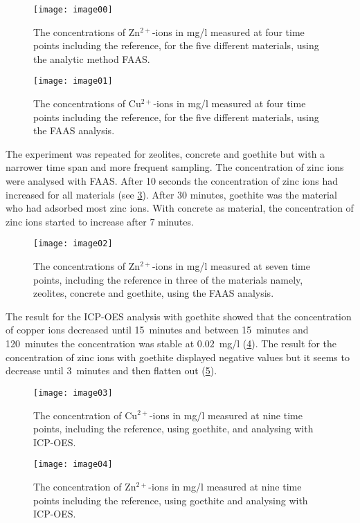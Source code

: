 \begin{figure}[H]
    \centering
    \texttt{[image: image00]}
    \caption{The concentrations of Zn$^{2+}$-ions in mg/l measured at four time points including the reference, for the five different materials, using the analytic method FAAS.}\label{fig:image00}
\end{figure}


\begin{figure}[H]
    \centering
    \texttt{[image: image01]}
    \caption{The concentrations of Cu$^{2+}$-ions in mg/l measured at four time points including the reference, for the five different materials, using the FAAS analysis.}\label{fig:image01}
\end{figure}

The experiment was repeated for zeolites, concrete and goethite but with a narrower time span and more frequent sampling. The concentration of zinc ions were analysed with FAAS. After 10 seconds the concentration of zinc ions had increased for all materials (see \cref{fig:image02}). After 30 minutes, goethite was the material who had adsorbed most zinc ions. With concrete as material, the concentration of zinc ions started to increase after 7 minutes.

\begin{figure}[H]
    \centering
    \texttt{[image: image02]}
    \caption{The concentrations of Zn$^{2+}$-ions in mg/l measured at seven time points, including the reference in three of the materials namely, zeolites, concrete and goethite, using the FAAS analysis.}\label{fig:image02}
\end{figure}

The result for the ICP-OES analysis with goethite showed that the concentration of copper ions decreased until 15~minutes and between 15~minutes and 120~minutes the concentration was stable at $0.02$~mg/l (\cref{fig:image03}). The result for the concentration of zinc ions with goethite displayed negative values but it seems to decrease until 3~minutes and then flatten out (\cref{fig:image04}).

\begin{figure}[H]
    \centering
    \texttt{[image: image03]}
    \caption{The concentration of Cu$^{2+}$-ions in mg/l measured at nine time points, including the reference, using goethite, and analysing with ICP-OES.}\label{fig:image03}
\end{figure}


\begin{figure}[H]
    \centering
    \texttt{[image: image04]}
    \caption{The concentration of Zn$^{2+}$-ions in mg/l measured at nine time points including the reference, using goethite and analysing with ICP-OES.}\label{fig:image04}
\end{figure}

